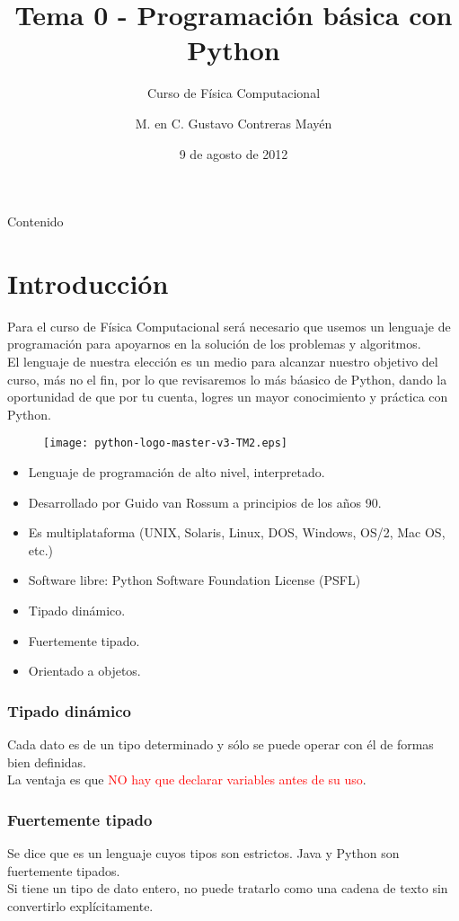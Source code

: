 \documentclass[12pt]{beamer}
\title{Tema 0 - Programaci\'{o}n b\'{a}sica con Python}
\subtitle{Curso de F\'{i}sica Computacional}
\author{M. en C. Gustavo Contreras May\'{e}n}
\date{9 de agosto de 2012}
\begin{document}
\maketitle
\fontsize{14}{14}\selectfont
{}
\begin{frame}{Contenido}
\tableofcontents[pausesections]
\end{frame}
\section{Introducci\'{o}n}
\begin{frame}
Para el curso de F\'{i}sica Computacional ser\'{a} necesario que usemos un lenguaje de programaci\'{o}n para apoyarnos en la soluci\'{o}n de los problemas y algoritmos.
\\
\bigskip
El lenguaje de nuestra elecci\'{o}n es un medio para alcanzar nuestro objetivo del curso, m\'{a}s no el fin, por lo que revisaremos lo m\'{a}s b\'{a}asico de Python, dando la oportunidad de que por tu cuenta, logres un mayor conocimiento y pr\'{a}ctica con Python.
\end{frame}
\begin{frame}
\begin{figure}
	\centering
	\texttt{[image: python-logo-master-v3-TM2.eps]} 
\end{figure}
\begin{itemize}
\item Lenguaje de programaci\'{o}n de alto nivel, interpretado.
\item Desarrollado por Guido van Rossum a principios de
los años 90.
\item Es multiplataforma (UNIX, Solaris, Linux, DOS, Windows, OS/2, Mac OS, etc.)
\item Software libre: Python Software Foundation License (PSFL)
\item Tipado din\'{a}mico.
\item Fuertemente tipado.
\item Orientado a objetos.
\end{itemize}
\end{frame}
\begin{frame}
\frametitle{Tipado din\'{a}mico}
Cada dato es de un tipo determinado y s\'{o}lo se puede operar con \'{e}l de formas bien definidas.
\\
\bigskip
La ventaja es que \textcolor{red}{NO hay que declarar variables antes de
su uso}.
\end{frame}
\begin{frame}
\frametitle{Fuertemente tipado}
Se dice que es un lenguaje cuyos tipos son estrictos. Java y Python son fuertemente tipados.
\\
\bigskip
Si tiene un tipo de dato entero, no puede tratarlo como una cadena de texto sin convertirlo expl\'{i}citamente.
\end{frame}
\end{document}
